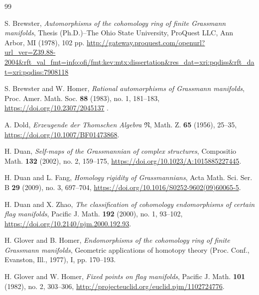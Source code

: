 \documentclass{amsart}
\begin{document}
\begin{thebibliography}{99}

 S. Brewster, \textit{Automorphisms of the cohomology ring of finite Grassmann manifolds}, %
Thesis (Ph.D.)--The Ohio State University, ProQuest LLC, Ann Arbor, MI (1978), 102 pp. \url{http://gateway.proquest.com/openurl?url_ver=Z39.88-2004&rft_val_fmt=info:ofi/fmt:kev:mtx:dissertation&res_dat=xri:pqdiss&rft_dat=xri:pqdiss:7908118}
	
 S. %
Brewster and W. Homer, \textit{Rational automorphisms of Grassmann manifolds}, Proc. Amer. Math. Soc. \textbf{88} (1983), no. %
1, 181--183, \url{https://doi.org/10.2307/2045137}%
.
	
 A. Dold, \textit{Erzeugende der Thomschen Algebra }$\mathfrak{N}$, Math. Z. \textbf{65} (1956), 25--35, \url{https://doi.org/10.1007/BF01473868}.

 H. Duan, \textit{Self-maps of the Grassmannian of complex structures}, Compositio Math. \textbf{132} (2002), no. 2, 159--175, \url{https://doi.org/10.1023/A:1015885227445}.
	
 H. Duan and L. Fang, \textit{Homology rigidity of Grassmannians}, Acta Math. Sci. Ser. B \textbf{29} (2009), no. 3, 697--704, \url{https://doi.org/10.1016/S0252-9602(09)60065-5}.

 H. Duan and X. Zhao, \textit{The classification of cohomology endomorphisms of certain flag manifolds}, Pacific J. Math. \textbf{192} (2000), no. 1, 93--102, \url{https://doi.org/10.2140/pjm.2000.192.93}.
	
 H. Glover and B. Homer, \textit{Endomorphisms of the cohomology ring of finite Grassmann manifolds}, Geometric applications of homotopy theory (Proc. Conf., Evanston, Ill., 1977), I, pp. 170--193.
	
 H. Glover and W. Homer, \textit{Fixed points on flag manifolds}, Pacific J. Math. \textbf{101} (1982), no. 2, 303--306, \url{http://projecteuclid.org/euclid.pjm/1102724776}.
	

\end{thebibliography}
\end{document}
